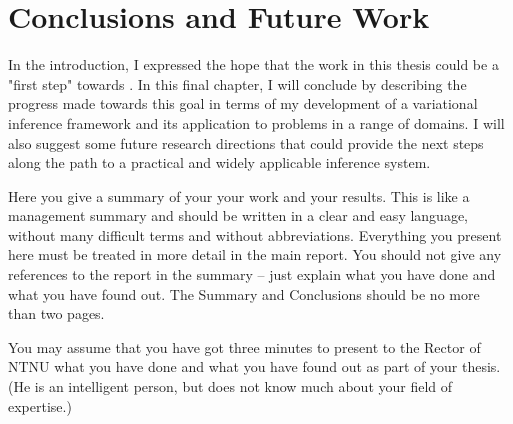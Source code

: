 \chapter{Conclusions and Future Work}
In the introduction, I expressed the hope that the work in this thesis could be a "first step" towards . In this final chapter, I will conclude by describing the progress made towards this goal in terms of my development of a variational inference framework and its application to problems in a range of domains. I will also suggest some future research directions that could provide the next steps along the path to a practical and widely applicable inference system.

Here you give a summary of your your work and your results. This is like a management summary and should be written in a clear and easy language, without many difficult terms and without abbreviations. Everything you present here must be treated in more detail in the main report. You should not give any references to the report in the summary -- just explain what you have done and what you have found out. The Summary and Conclusions should be no more than two pages.

You may assume that you have got three minutes to present to the Rector of NTNU  what you have done and what you have found out as part of your thesis. (He is an intelligent person, but does not know much about your field of expertise.)